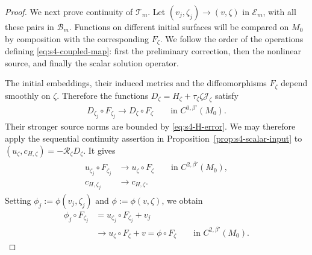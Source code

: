 \documentclass[a4paper,11pt,oneside,reqno]{amsart}
\numberwithin{equation}{section}
\theoremstyle{definition}
\begin{document}
\begin{proof}
    We next prove continuity of $\mathcal T_m$. Let
    $(v_j,\zeta_j)\to(v,\zeta)$ in $\mathcal E_m$, with all
    these pairs in $\mathcal B_m$. Functions on different
    initial surfaces will be compared on $M_0$ by composition
    with the corresponding $F_\zeta$. We follow the order of
    the operations defining \eqref{eq:s4-coupled-map}: first
    the preliminary correction, then the nonlinear source,
    and finally the scalar solution operator.

    The initial embeddings, their induced metrics and the
    diffeomorphisms $F_\zeta$ depend smoothly on $\zeta$.
    Therefore the functions
    $D_\zeta=H_\zeta+\tau_\zeta\zeta\mathcal J_\zeta$
    satisfy
    \begin{align*}
        D_{\zeta_j}\circ F_{\zeta_j}
        \rightarrow D_\zeta\circ F_\zeta
        \qquad\text{in }C^{0,\beta'}(M_0).
    \end{align*}
    Their stronger source norms are bounded by
    \eqref{eq:s4-H-error}. We may therefore apply the
    sequential continuity assertion in
    Proposition~\ref{prop:s4-scalar-input} to
    $(u_\zeta,c_{H,\zeta})=-\mathscr R_\zeta D_\zeta$.
    It gives
    \begin{align}
        \label{eq:s4-initial-correction-continuity}
        \begin{split}
            u_{\zeta_j}\circ F_{\zeta_j}
            &\rightarrow u_\zeta\circ F_\zeta
            \qquad\text{in }C^{2,\beta'}(M_0),\\
            c_{H,\zeta_j}&\rightarrow c_{H,\zeta}.
        \end{split}
    \end{align}
    Setting $\phi_j:=\phi(v_j,\zeta_j)$ and
    $\phi:=\phi(v,\zeta)$, we obtain
    \begin{align*}
        \phi_j\circ F_{\zeta_j}
        &=u_{\zeta_j}\circ F_{\zeta_j}+v_j\\
        &\rightarrow u_\zeta\circ F_\zeta+v
        =\phi\circ F_\zeta
        \qquad\text{in }C^{2,\beta'}(M_0).
    \end{align*}


\end{proof}
\end{document}
